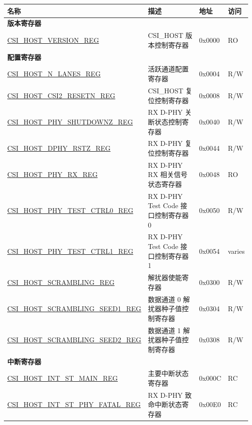 \begin{longtable}{ | p{8.2cm} | p{6cm} | p{1.2cm} | p{0.8cm} | }
\hline\rowcolor{lightgray}
\textbf{名称} & \textbf{描述} &  \textbf{地址} & \textbf{访问} \\ \hline
\endhead
\multicolumn{4}{|l|}{\textbf{版本寄存器}} \\ \hline
\hyperref[regdesc:CSIHOSTVERSIONREG]{CSI\_HOST\_VERSION\_REG} & CSI\_HOST 版本控制寄存器 & 0x0000 & RO \\ \hline
\multicolumn{4}{|l|}{\textbf{配置寄存器}} \\ \hline
\hyperref[regdesc:CSIHOSTNLANESREG]{CSI\_HOST\_N\_LANES\_REG} & 活跃通道配置寄存器 & 0x0004 & R/W \\ \hline
\hyperref[regdesc:CSIHOSTCSI2RESETNREG]{CSI\_HOST\_CSI2\_RESETN\_REG} & CSI\_HOST 复位控制寄存器 & 0x0008 & R/W \\ \hline
\hyperref[regdesc:CSIHOSTPHYSHUTDOWNZREG]{CSI\_HOST\_PHY\_SHUTDOWNZ\_REG} & RX D-PHY 关断状态控制寄存器 & 0x0040 & R/W \\ \hline
\hyperref[regdesc:CSIHOSTDPHYRSTZREG]{CSI\_HOST\_DPHY\_RSTZ\_REG} & RX D-PHY 复位控制寄存器 & 0x0044 & R/W \\ \hline
\hyperref[regdesc:CSIHOSTPHYRXREG]{CSI\_HOST\_PHY\_RX\_REG} & RX D-PHY RX 相关信号状态寄存器 & 0x0048 & RO \\ \hline
\hyperref[regdesc:CSIHOSTPHYTESTCTRL0REG]{CSI\_HOST\_PHY\_TEST\_CTRL0\_REG} & RX D-PHY Test Code 接口控制寄存器 0 & 0x0050 & R/W \\ \hline
\hyperref[regdesc:CSIHOSTPHYTESTCTRL1REG]{CSI\_HOST\_PHY\_TEST\_CTRL1\_REG} & RX D-PHY Test Code 接口控制寄存器 1 & 0x0054 & varies \\ \hline
\hyperref[regdesc:CSIHOSTSCRAMBLINGREG]{CSI\_HOST\_SCRAMBLING\_REG} & 解扰器使能寄存器 & 0x0300 & R/W \\ \hline
\hyperref[regdesc:CSIHOSTSCRAMBLINGSEED1REG]{CSI\_HOST\_SCRAMBLING\_SEED1\_REG} & 数据通道 0 解扰器种子值控制寄存器 & 0x0304 & R/W \\ \hline
\hyperref[regdesc:CSIHOSTSCRAMBLINGSEED2REG]{CSI\_HOST\_SCRAMBLING\_SEED2\_REG} & 数据通道 1 解扰器种子值控制寄存器 & 0x0308 & R/W \\ \hline
\multicolumn{4}{|l|}{\textbf{中断寄存器}} \\ \hline
\hyperref[regdesc:CSIHOSTINTSTMAINREG]{CSI\_HOST\_INT\_ST\_MAIN\_REG} & 主要中断状态寄存器 & 0x000C & RC \\ \hline
\hyperref[regdesc:CSIHOSTINTSTPHYFATALREG]{CSI\_HOST\_INT\_ST\_PHY\_FATAL\_REG} & RX D-PHY 致命中断状态寄存器 & 0x00E0 & RC \\ \hline

\end{longtable}
